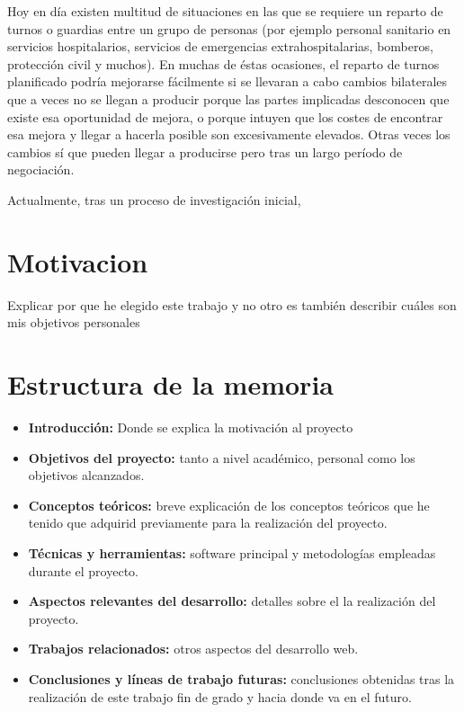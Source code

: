 

Hoy en día existen multitud de situaciones en las que se requiere un reparto de turnos o guardias entre un grupo de personas (por ejemplo personal sanitario en servicios hospitalarios, servicios de emergencias extrahospitalarias, bomberos, protección civil y muchos). En muchas de éstas ocasiones, el reparto de turnos planificado podría mejorarse fácilmente si se llevaran a cabo cambios bilaterales que a veces no se llegan a producir porque las partes implicadas desconocen que existe esa oportunidad de mejora, o porque intuyen que los costes de encontrar esa mejora y llegar a  hacerla posible son excesivamente elevados. Otras veces los cambios sí que pueden llegar a producirse pero tras un largo período de negociación.

Actualmente, tras un proceso de investigación inicial,  

\section{Motivacion}\label{Motivacion}

Explicar por que he elegido este trabajo y no otro es también describir cuáles son mis objetivos personales 

\section{Estructura de la memoria}\label{estructura-de-la-memoria}

\begin{itemize}
\tightlist
\item
  \textbf{Introducción:} Donde se explica la motivación al proyecto
\item
  \textbf{Objetivos del proyecto:} tanto a nivel académico, personal como los objetivos alcanzados.
\item
  \textbf{Conceptos teóricos:} breve explicación de los conceptos
  teóricos que he tenido que adquirid previamente para la realización del proyecto.
\item
  \textbf{Técnicas y herramientas:} software principal y metodologías empleadas durante el proyecto.
\item
  \textbf{Aspectos relevantes del desarrollo:} detalles sobre el la realización del proyecto.
\item
  \textbf{Trabajos relacionados:} otros aspectos del desarrollo web.
\item
  \textbf{Conclusiones y líneas de trabajo futuras:} conclusiones
  obtenidas tras la realización de este trabajo fin de grado y hacia donde va en el futuro.
\end{itemize}
